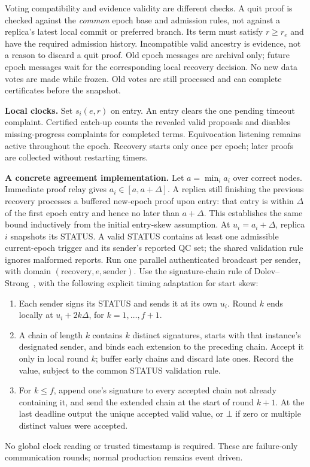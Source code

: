 \documentclass[10pt,a4paper]{article}
\begin{document}
Voting compatibility and evidence validity are different checks. A quit
proof is checked against the \emph{common} epoch base and admission rules,
not against a replica's latest local commit or preferred branch. Its term
must satisfy $r\ge r_e$ and have the required admission history. Incompatible
valid ancestry is evidence, not a reason to discard a quit proof. Old epoch
messages are archival only; future epoch messages wait for the corresponding
local recovery decision. No new data votes are made while frozen. Old votes
are still processed and can complete certificates before the snapshot.

\textbf{Local clocks.} Set $s_i(e,r)$ on entry. An entry clears the one
pending timeout complaint. Certified catch-up counts the revealed valid
proposals and disables missing-progress complaints for completed terms.
Equivocation listening remains active throughout the epoch. Recovery starts
only once per epoch; later proofs are collected without restarting timers.

\textbf{A concrete agreement implementation.} Let $a=\min_i a_i$ over correct
nodes. Immediate proof relay gives $a_i\in[a,a+\Delta]$. A replica still
finishing the previous recovery processes a buffered new-epoch proof upon
entry: that entry is within $\Delta$ of the first epoch entry and hence
no later than $a+\Delta$. This establishes the same bound inductively
from the initial entry-skew assumption. At
$u_i=a_i+\Delta$, replica $i$ snapshots its STATUS. A valid STATUS contains
at least one admissible current-epoch trigger and its sender's reported QC
set; the shared validation rule ignores malformed reports. Run one parallel
authenticated broadcast per sender, with domain $(\text{recovery},e,\text{sender})$.
Use the signature-chain rule of Dolev--Strong~\cite{ds}, with the following
explicit timing adaptation for start skew:
\begin{enumerate}[label=\arabic*.,itemsep=3pt]
\item Each sender signs its STATUS and sends it at its own $u_i$. Round $k$
ends locally at $u_i+2k\Delta$, for $k=1,\ldots,f+1$.
\item A chain of length $k$ contains $k$ distinct signatures, starts with
that instance's designated sender, and binds each extension to the preceding
chain. Accept it only in local round $k$; buffer early chains and discard
late ones. Record the value, subject to the common STATUS validation rule.
\item For $k\le f$, append one's signature to every accepted chain not
already containing it, and send the extended chain at the start of round
$k+1$. At the last deadline output the unique accepted valid value, or
$\bot$ if zero or multiple distinct values were accepted.
\end{enumerate}
No global clock reading or trusted timestamp is required. These are
failure-only communication rounds; normal production remains event driven.
\end{document}
